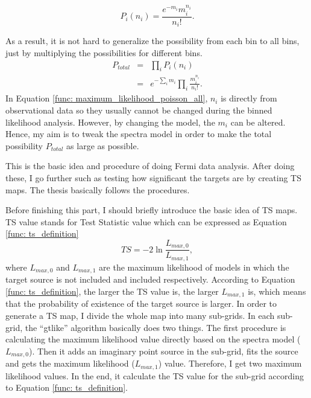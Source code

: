 \documentclass[a4paper, 12pt]{report}
\begin{document}
      \begin{equation}
        P_{i}\left(n_{i}\right) = \frac{e^{-m_{i}} m_{i}^{n_{i}}}{n_{i}!} .
        \label{func: maximum_likelihood_poisson}
      \end{equation}

      As a result, it is not hard to generalize the possibility from each bin to all bins, 
      just by multiplying the possibilities for different bins.
      \begin{eqnarray}
        P_{total} &=& \prod_{i}^{}P_{i}\left(n_{i}\right)  \nonumber \\ 
                  &=& e^{-\sum_{i}^{}m_i}\prod_{i}^{}\frac{m_{i}^{n_i}}{n_i!} .
        \label{func: maximum_likelihood_poisson_all}
      \end{eqnarray}
      In Equation \ref{func: maximum_likelihood_poisson_all}, $n_i$ is directly 
      from observational data so they usually cannot be changed during the binned likelihood 
      analysis. However, by changing the model, the $m_i$ can be altered. 
      Hence, my aim is to tweak the spectra model in order to make the total possibility 
      $P_{total}$ as large as possible. 

      This is the basic idea and procedure of doing Fermi data analysis. After doing these,
      I go further such as testing how significant the targets are by creating TS 
      maps. The thesis basically follows the procedures. 

      Before finishing this part, I should briefly introduce the basic idea of TS maps. 
      TS value stands for Test Statistic value which can be expressed as Equation 
      \ref{func: ts_definition} 
      \begin{equation}
        TS = -2 \ln{\frac{L_{max,0}}{L_{max,1}}} ,
        \label{func: ts_definition}
      \end{equation}
      where $L_{max,0}$ and $L_{max,1}$ are the maximum likelihood of models in which the 
      target source is not included and included respectively. According to Equation 
      \ref{func: ts_definition}, the larger the TS value is, the larger $L_{max, 1}$ is, 
      which means that the probability of existence of the target source is larger. 
      In order to generate a TS map, I divide the whole map into many sub-grids. In each 
      sub-grid, the ``gtlike'' algorithm basically does two things. The first procedure is 
      calculating the maximum likelihood value directly based on the spectra model 
      ($L_{max,0}$). Then it adds an imaginary point source in the sub-grid, fits the source 
      and gets the maximum likelihood ($L_{max, 1}$) value. Therefore, I get two 
      maximum likelihood values. In the end, it calculate the TS value for the 
      sub-grid according to Equation \ref{func: ts_definition}. 
\end{document}
